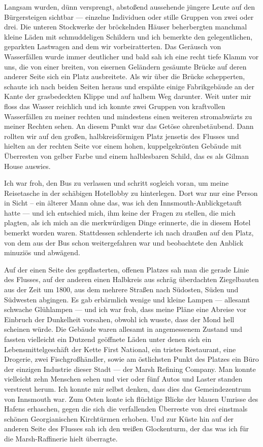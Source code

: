 Langsam wurden, dünn versprengt, abstoßend aussehende jüngere Leute auf den Bürgersteigen sichtbar --- einzelne Individuen oder stille Gruppen von zwei oder drei. Die unteren Stockwerke der bröckelnden Häuser beherbergten manchmal kleine Läden mit schmuddeligen Schildern und ich bemerkte den gelegentlichen, geparkten Lastwagen and dem wir vorbeiratterten. Das Geräusch von Wasserfällen wurde immer deutlicher  und bald sah ich eine recht tiefe Klamm vor uns, die von einer breiten, von eisernen Geländern gesäumte Brücke auf deren anderer Seite sich ein Platz ausbreitete. Als wir über die Brücke schepperten, schaute ich nach beiden Seiten heraus und erspähte einige Fabrikgebäude an der Kante der grasbedeckten Klippe und auf halbem Weg darunter. Weit unter mir floss das Wasser reichlich und ich konnte zwei Gruppen von kraftvollen Wasserfällen zu meiner rechten und mindestens einen weiteren stromabwärts zu meiner Rechten sehen. An diesem Punkt war das Getöse ohrenbetäubend. Dann rollten wir auf den großen, halbkreisförmigen Platz jensetis des Flusses und hielten an der rechten Seite vor einem hohen, kuppelgekrönten Gebäude mit Überresten von gelber Farbe und einem halblesbaren Schild, das es als Gilman House auswies.

Ich war froh, den Bus zu verlassen und schritt sogleich voran, um meine Reisetasche in der schäbigen Hotellobby zu hinterlegen. Dort war nur eine Person in Sicht -- ein älterer Mann ohne das, was ich den \glqq Innsmouth-Anblick\grqq getauft hatte --- und ich entschied mich, ihm keine der Fragen zu stellen, die mich plagten, als ich mich an die merkwürdigen Dinge erinnerte, die in diesem Hotel bemerkt worden waren. Stattdessen schlenderte ich nach draußen auf den Platz, von dem aus der Bus schon weitergefahren war und beobachtete den Anblick minuziös und abwägend.

Auf der einen Seite des gepflasterten, offenen Platzes sah man die gerade Linie des Flusses, auf der anderen einen Halbkreis aus schräg überdachten Ziegelbauten aus der Zeit um 1800, aus dem mehrere Straßen nach Südosten, Süden und Südwesten abgingen. Es gab erbärmlich wenige und kleine Lampen --- allesamt schwache Glühlampen --- und ich war froh, dass meine Pläne eine Abreise vor Einbruch der Dunkelheit vorsahen, obwohl ich wusste, dass der Mond hell scheinen würde. Die Gebäude waren allesamt in angemessenem Zustand und fassten vielleicht ein Dutzend geöffnete Läden unter denen sich ein Lebensmittelgeschäft der Kette First National, ein tristes Restaurant, eine Drogerie, zwei Fischgroßhändler, sowie am östlichsten Punkt des Platzes ein Büro der einzigen Industrie dieser Stadt --- der Marsh Refining Company. Man konnte vielleicht zehn Menschen sehen und vier oder fünf Autos und Laster standen verstreut herum. Ich konnte mir selbst denken, dass dies das Gemeindezentrum von Innsmouth war. Zum Osten konte ich flüchtige Blicke der blauen Umrisse des Hafens erhaschen, gegen die sich die verfallenden Überreste von drei einstmals schönen Georgianischen Kirchtürmen erhoben. Und zur Küste hin auf der anderen Seite des Flusses sah ich den weißen Glockenturm, der das was ich für die Marsh-Raffinerie hielt überragte.

